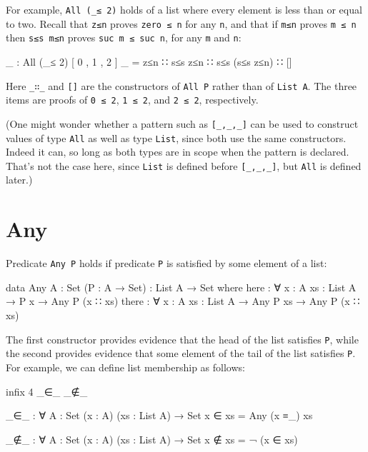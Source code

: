 For example, \texttt{All\ (\_≤\ 2)} holds of a list where every element
is less than or equal to two. Recall that \texttt{z≤n} proves
\texttt{zero\ ≤\ n} for any \texttt{n}, and that if \texttt{m≤n} proves
\texttt{m\ ≤\ n} then \texttt{s≤s\ m≤n} proves
\texttt{suc\ m\ ≤\ suc\ n}, for any \texttt{m} and \texttt{n}:

\begin{fence}
\begin{code}
_ : All (_≤ 2) [ 0 , 1 , 2 ]
_ = z≤n ∷ s≤s z≤n ∷ s≤s (s≤s z≤n) ∷ []
\end{code}
\end{fence}

Here \texttt{\_∷\_} and \texttt{{[}{]}} are the constructors of
\texttt{All\ P} rather than of \texttt{List\ A}. The three items are
proofs of \texttt{0\ ≤\ 2}, \texttt{1\ ≤\ 2}, and \texttt{2\ ≤\ 2},
respectively.

(One might wonder whether a pattern such as \texttt{{[}\_,\_,\_{]}} can
be used to construct values of type \texttt{All} as well as type
\texttt{List}, since both use the same constructors. Indeed it can, so
long as both types are in scope when the pattern is declared. That's not
the case here, since \texttt{List} is defined before
\texttt{{[}\_,\_,\_{]}}, but \texttt{All} is defined later.)

\hypertarget{any}{%
\section{Any}\label{any}}

Predicate \texttt{Any\ P} holds if predicate \texttt{P} is satisfied by
some element of a list:

\begin{fence}
\begin{code}
data Any {A : Set} (P : A → Set) : List A → Set where
  here  : ∀ {x : A} {xs : List A} → P x → Any P (x ∷ xs)
  there : ∀ {x : A} {xs : List A} → Any P xs → Any P (x ∷ xs)
\end{code}
\end{fence}

The first constructor provides evidence that the head of the list
satisfies \texttt{P}, while the second provides evidence that some
element of the tail of the list satisfies \texttt{P}. For example, we
can define list membership as follows:

\begin{fence}
\begin{code}
infix 4 _∈_ _∉_

_∈_ : ∀ {A : Set} (x : A) (xs : List A) → Set
x ∈ xs = Any (x ≡_) xs

_∉_ : ∀ {A : Set} (x : A) (xs : List A) → Set
x ∉ xs = ¬ (x ∈ xs)
\end{code}
\end{fence}

